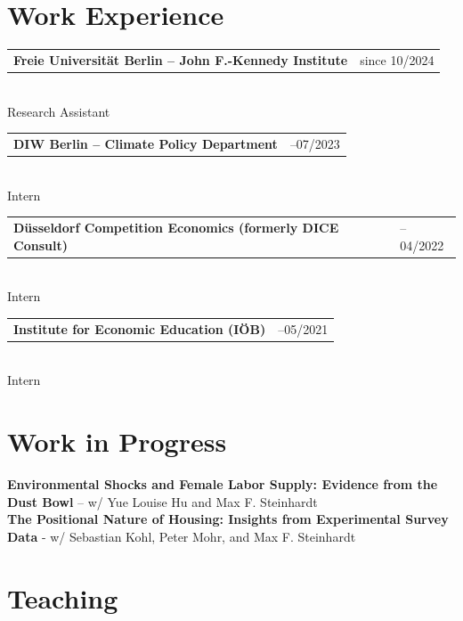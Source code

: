 \documentclass[10pt,a4paper]{article}
\makeatletter
\newlength{\datecolwidth}
\newlength{\contentcolwidth}
\newcommand{\cvitem}[2]{%
  \begin{tabular}{@{} p{\contentcolwidth} >{\raggedleft\arraybackslash}p{\datecolwidth} @{}}
    #2 & #1
  \end{tabular}\\[0.05em]
}
\makeatother
\begin{document}



\section{\large Work Experience}

\cvitem{since 10/2024}{\textbf{Freie Universität Berlin -- John F.-Kennedy Institute}}
Research Assistant \\[0.15cm]
\cvitem{05--07/2023}{\textbf{DIW Berlin -- Climate Policy Department}}
Intern \\[0.15cm]
\cvitem{02--04/2022}{\textbf{Düsseldorf Competition Economics (formerly DICE Consult)}}
Intern \\[0.15cm]
\cvitem{03--05/2021}{\textbf{Institute for Economic Education (IÖB)}}
Intern \\[0.15cm]

\section{\large Work in Progress}

\textbf{Environmental Shocks and Female Labor Supply: Evidence from the Dust Bowl} – w/ Yue Louise Hu and Max F. Steinhardt 
\vspace{0.2cm}\\
\textbf{The Positional Nature of Housing: Insights from Experimental Survey Data} - w/ Sebastian Kohl, Peter Mohr, and Max F. Steinhardt \\


\section{\large Teaching}
\end{document}
